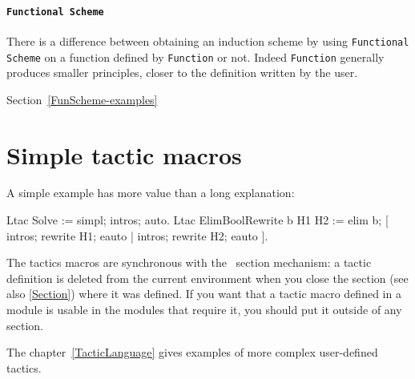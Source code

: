 \paragraph{\texttt{Functional Scheme}} 
There is a difference between obtaining an induction scheme by using
\texttt{Functional Scheme} on a function defined by \texttt{Function}
or not. Indeed \texttt{Function} generally produces smaller
principles, closer to the definition written by the user.


\SeeAlso Section~\ref{FunScheme-examples}


\section{Simple tactic macros
\label{TacticDefinition}}

A simple example has more value than a long explanation: 

\begin{coq_example}
Ltac Solve := simpl; intros; auto.
Ltac ElimBoolRewrite b H1 H2 :=
  elim b; [ intros; rewrite H1; eauto | intros; rewrite H2; eauto ].
\end{coq_example}

The tactics macros are synchronous with the \Coq\ section mechanism:
a tactic definition is deleted from the current environment
when you close the section (see also \ref{Section}) 
where it was defined. If you want that a
tactic macro defined in a module is usable in the modules that
require it, you should put it outside of any section.

The chapter~\ref{TacticLanguage} gives examples of more complex
user-defined tactics.




